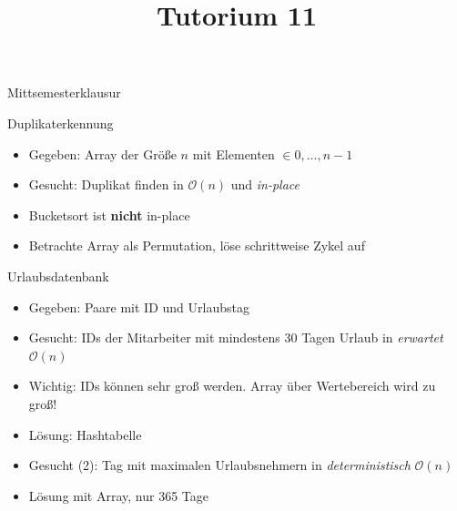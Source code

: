 
\title[Algorithmen I SS 14]{Tutorium 11}

\usepackage{alltt}




\begin{frame}
  \maketitle
\end{frame}

\begin{frame}
	\begin{center}
		\Huge
		Mittsemesterklausur
	\end{center}
\end{frame}

\begin{frame}{Duplikaterkennung}
	\begin{itemize}
		\item Gegeben: Array der Größe $n$ mit Elementen $\in {0, \ldots, n - 1}$
		\item Gesucht: Duplikat finden in $\mathcal{O}(n)$ und \emph{in-place}
		\item Bucketsort ist \textbf{nicht} in-place
		\item Betrachte Array als Permutation, löse schrittweise Zykel auf
	\end{itemize}
\end{frame}

\begin{frame}{Urlaubsdatenbank}
	\begin{itemize}
		\item Gegeben: Paare mit ID und Urlaubstag
		\item Gesucht: IDs der Mitarbeiter mit mindestens 30 Tagen Urlaub in \emph{erwartet} $\mathcal{O}(n)$
		\item Wichtig: IDs können sehr groß werden. Array über Wertebereich wird zu groß!
		\item Lösung: Hashtabelle
		\item Gesucht (2): Tag mit maximalen Urlaubsnehmern in \emph{deterministisch} $\mathcal{O}(n)$
		\item Lösung mit Array, nur 365 Tage
	\end{itemize}
\end{frame}

